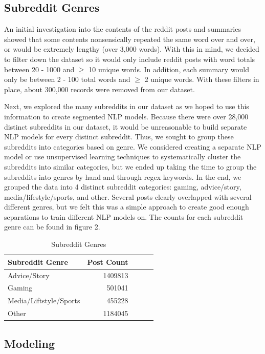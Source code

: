\documentclass[11pt,a4paper, twocolumn]{article}
\begin{document}
\subsection{Subreddit Genres}

An initial investigation into the contents of the reddit posts and summaries showed that some contents nonsensically repeated the same word over and over, or would be extremely lengthy (over 3,000 words). With this in mind, we decided to filter down the dataset so it would only include reddit posts with word totals between 20 - 1000 and $\geq$ 10 unique words. In addition, each summary would only be between 2 - 100 total words and $\geq$ 2 unique words. With these filters in place, about 300,000 records were removed from our dataset. 

Next, we explored the many subreddits in our dataset as we hoped to use this information to create segmented NLP models. 
Because there were over 28,000 distinct subreddits in our dataset, it would be unreasonable to build separate NLP models for every distinct subreddit. 
Thus, we sought to group these subreddits into categories based on genre. 
We considered creating a separate NLP model or use unsupervised learning techniques to systematically cluster the subreddits into similar categories, 
but we ended up taking the time to group the subreddits into genres by hand and through regex keywords. 
In the end, we grouped the data into 4 distinct subreddit categories: gaming, advice/story, media/lifestyle/sports, and other. 
Several posts clearly overlapped with several different genres, but we felt this was a simple approach to create good enough separations to train different NLP models on. 
The counts for each subreddit genre can be found in figure 2. 

\begin{table}
  \centering
  \begin{tabular}{lrlll}
  \hline \textbf{Subreddit Genre} & \textbf{Post Count}\\ \hline
  Advice/Story & 1409813 \\
  Gaming & 501041 \\
  Media/Liftstyle/Sports & 455228 \\
  Other & 1184045 \\
  \hline
  \end{tabular}
  \caption{\label{font-table} Subreddit Genres}
\end{table}


\subsection{Modeling}
\end{document}
